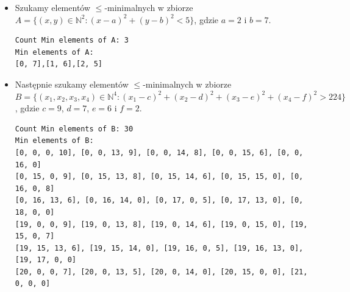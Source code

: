 \documentclass[12pt, a4paper]{article}
\begin{document}
\begin{itemize}
    \item  Szukamy elementów $\leq$-minimalnych w zbiorze
    $A = \{(x,y)\in \mathbb{N}^2 : (x-a)^2 + (y-b)^2 < 5\}$, gdzie $a=2$ i $b=7$.
\begin{verbatim}
Count Min elements of A: 3
Min elements of A:
[0, 7],[1, 6],[2, 5]
\end{verbatim}
    \item Następnie szukamy elementów $\leq$-minimalnych w zbiorze
    $B = \{(x_1,x_2,x_3,x_4) \in \mathbb{N}^4 : (x_1-c)^2 + (x_2-d)^2 + (x_3-e)^2 + (x_4-f)^2 > 224\}$, gdzie $c=9$, $d=7$, $e=6$ i $f=2$.
\begin{verbatim}
Count Min elements of B: 30
Min elements of B:
[0, 0, 0, 10], [0, 0, 13, 9], [0, 0, 14, 8], [0, 0, 15, 6], [0, 0, 16, 0]
[0, 15, 0, 9], [0, 15, 13, 8], [0, 15, 14, 6], [0, 15, 15, 0], [0, 16, 0, 8]
[0, 16, 13, 6], [0, 16, 14, 0], [0, 17, 0, 5], [0, 17, 13, 0], [0, 18, 0, 0]
[19, 0, 0, 9], [19, 0, 13, 8], [19, 0, 14, 6], [19, 0, 15, 0], [19, 15, 0, 7]
[19, 15, 13, 6], [19, 15, 14, 0], [19, 16, 0, 5], [19, 16, 13, 0], [19, 17, 0, 0]
[20, 0, 0, 7], [20, 0, 13, 5], [20, 0, 14, 0], [20, 15, 0, 0], [21, 0, 0, 0]   
\end{verbatim}
\end{itemize} 
\end{document}

